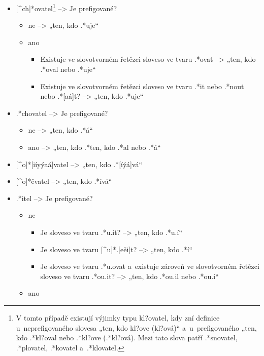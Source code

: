 \begin{itemize}
\tightlist
\item
  {[}\^{}ch{]}*ovatel\footnote{V tomto případě existují výjimky typu kl?ovatel, kdy zní definice u~neprefigovaného slovesa „ten, kdo kl?ove (kl?ová)“ a~u~prefigovaného „ten, kdo .*kl?oval nebo .*kl?ove (.*kl?ová). Mezi tato slova patří .*snovatel, .*plovatel, .*kovatel a~.*klovatel.}
  --\textgreater{} Je prefigované?

  \begin{itemize}
  \tightlist
  \item
    ne --\textgreater{} „ten, kdo .*uje``
  \item
    ano

    \begin{itemize}
    \tightlist
    \item
      Existuje ve slovotvorném řetězci sloveso ve tvaru .*ovat
      --\textgreater{} „ten, kdo .*oval nebo .*uje``
    \item
      Existuje ve slovotvorném řetězci sloveso ve tvaru .*it nebo .*nout
      nebo .*{[}aá{]}t? --\textgreater{} „ten, kdo .*uje``
    \end{itemize}
  \end{itemize}
\item
  .*chovatel --\textgreater{} Je prefigované?

  \begin{itemize}
  \tightlist
  \item
    ne --\textgreater{} „ten, kdo .*á``
  \item
    ano --\textgreater{} „ten, kdo .*ten, kdo .*al nebo .*á``
  \end{itemize}
\item
  {[}\^{}o{]}*{[}iíyýaá{]}vatel --\textgreater{} „ten, kdo
  .*{[}íýá{]}vá``
\item
  {[}\^{}o{]}*ěvatel --\textgreater{} „ten, kdo .*ívá``
\item
  .*itel --\textgreater{} Je prefigované?

  \begin{itemize}
  \tightlist
  \item
    ne

    \begin{itemize}
    \tightlist
    \item
      Je sloveso ve tvaru .*u.it? --\textgreater{} „ten, kdo .*u.í``
    \item
      Je sloveso ve tvaru {[}\^{}u{]}*.{[}eěi{]}t? --\textgreater{}
      „ten, kdo .*í``
    \item
      Je sloveso ve tvaru .*u.ovat a~existuje zároveň ve slovotvorném
      řetězci sloveso ve tvaru .*ou.it? --\textgreater{} „ten, kdo
      .*ou.il nebo .*ou.í``
    \end{itemize}
  \item
    ano


\end{itemize}
\end{itemize}
